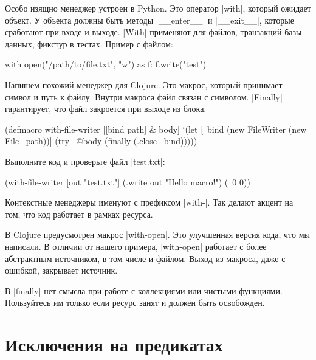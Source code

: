 Особо изящно менеджер устроен в Python. Это оператор \spverb|with|, который
ожидает объект. У объекта должны быть методы \spverb|__enter__| и
\spverb|__exit__|, которые сработают при входе и выходе. \spverb|With| применяют
для файлов, транзакций базы данных, фикстур в тестах. Пример с файлом:

\begin{english}
  \begin{python}
with open("/path/to/file.txt", "w") as f:
    f.write("test")
  \end{python}
\end{english}

Напишем похожий менеджер для Clojure. Это макрос, который принимает символ и
путь к файлу. Внутри макроса файл связан с символом. \spverb|Finally|
гарантирует, что файл закроется при выходе из блока.

\begin{english}
  \begin{clojure}
(defmacro with-file-writer
  [[bind path] & body]
  `(let [~bind (new FileWriter (new File ~path))]
     (try
       ~@body
       (finally
         (.close ~bind)))))
  \end{clojure}
\end{english}

\noindent
Выполните код и проверьте файл \spverb|test.txt|:

\begin{english}
  \begin{clojure}
(with-file-writer [out "test.txt"]
  (.write out "Hello macro!")
  (\ 0 0))
  \end{clojure}
\end{english}

Контекстные менеджеры именуют с префиксом \spverb|with-|. Так делают акцент на
том, что код работает в рамках ресурса.

В Clojure предусмотрен макрос \spverb|with-open|. Это улучшенная версия кода,
что мы написали. В отличии от нашего примера, \spverb|with-open| работает с
более абстрактным источником, в том числе и файлом. Выход из макроса, даже с
ошибкой, закрывает источник.

В \spverb|finally| нет смысла при работе с коллекциями или чистыми
функциями. Пользуйтесь им только если ресурс занят и должен быть освобожден.

\section{Исключения на предикатах}

